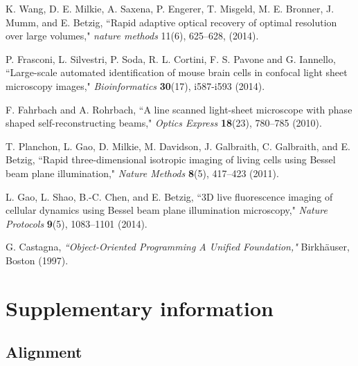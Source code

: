 \documentclass[12pt]{spieman}  %
\begin{document}
\begin{thebibliography}{0}
 K. Wang, D. E. Milkie, A. Saxena, P. Engerer, T. Misgeld, M. E. Bronner, J. Mumm, and E. Betzig, ``Rapid adaptive optical recovery of optimal resolution over large volumes," \emph{nature methods} 11(6), 625–628, (2014).

 P. Frasconi, L. Silvestri, P. Soda, R. L. Cortini, F. S. Pavone and G. Iannello, ``Large-scale automated identification of mouse brain cells in confocal light sheet microscopy images," \emph{Bioinformatics} \textbf{30}(17), i587-i593 (2014).

 F. Fahrbach and A. Rohrbach, ``A line scanned light-sheet microscope with phase shaped self-reconstructing beams," \emph{Optics Express} \textbf{18}(23), 780–785 (2010).

 T. Planchon, L. Gao, D. Milkie, M. Davidson, J. Galbraith, C. Galbraith, and E. Betzig, ``Rapid three-dimensional isotropic imaging of living cells using Bessel beam plane illumination," \emph{Nature Methods} \textbf{8}(5), 417–423 (2011).

 L. Gao, L. Shao, B.-C. Chen, and E. Betzig, ``3D live fluorescence imaging of cellular dynamics using Bessel beam plane illumination microscopy," \emph{Nature Protocols} \textbf{9}(5), 1083–1101 (2014).



 G. Castagna, \emph{``Object-Oriented Programming A Unified Foundation,"} Birkh{\"a}user, Boston (1997).

\end{thebibliography}





\pagebreak
\section{Supplementary information}

\subsection{Alignment}
\end{document}
